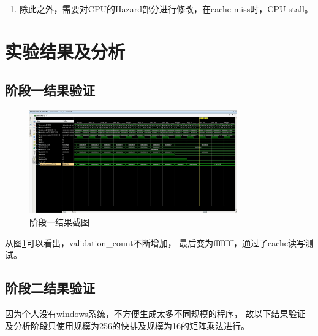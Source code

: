 \documentclass[UTF8]{article}
\begin{document}
\begin{enumerate}
\begin{lstlisting}[language=verilog]
                    end
                    else
                    begin
                        info[set_addr][i] <= info[set_addr][i] + 1;
                    end
                end
            end
            else if(cache_stat == SWAP_IN_OK)  // if not hit, then swap, and only update info when swap finish.
            begin
                for(integer i = 0; i < WAY_CNT; i++)
                begin
                    if(i == mem_line_idx)
                    begin
                        info[set_addr][i] <= 32'b0;
                    end
                    else
                    begin
                        info[set_addr][i] <= info[set_addr][i] + 1;
                    end
                end
            end
        end
    end
end
        \end{lstlisting}
        \item 除此之外，需要对CPU的{\jetbrains Hazard}部分进行修改，在cache miss时，CPU stall。
    \end{enumerate}
    \section{实验结果及分析}
    \subsection{阶段一结果验证}
    \begin{figure}[H]
        \centering
        \includegraphics[width=0.8\textwidth]{./fig/stage1.jpg}
        \caption{阶段一结果截图}
        \label{stage1}
    \end{figure}
    从图\ref{stage1}可以看出，{\jetbrains validation\_count}不断增加，
    最后变为{\jetbrains ffffffff}，通过了cache读写测试。
    \subsection{阶段二结果验证}
    因为个人没有windows系统，不方便生成太多不同规模的程序，
    故以下结果验证及分析阶段只使用规模为256的快排及规模为16的矩阵乘法进行。
\end{document}
